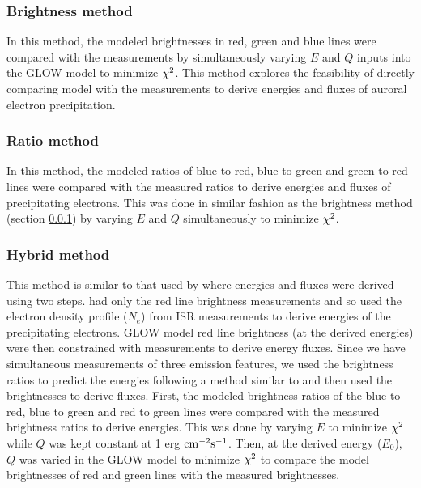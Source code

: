 \documentclass[crop=false,class=mitthesis,oneside,font=12pt]{standalone}
\begin{document}
\subsubsection{Brightness method}
\label{sec:brightness}
In this method, the modeled brightnesses in red, green and blue lines were compared with the measurements by simultaneously varying $E$ and $Q$ inputs into the GLOW model to minimize $\rm \chi^2$. This method explores the feasibility of directly comparing model with the measurements to derive energies and fluxes of auroral electron precipitation.

\subsubsection{Ratio method}
\label{sec:ratio}
In this method, the modeled ratios of blue to red, blue to green and green to red lines were compared with the measured ratios to derive energies and fluxes of precipitating electrons. This was done in similar fashion as the brightness method (section \ref{sec:brightness}) by varying $E$ and $Q$ simultaneously to minimize $\rm \chi^2$. 

\subsubsection{Hybrid method}
\label{sec:2step}

This method is similar to that used by \cite{pallamraju_2011} where energies and fluxes were derived using two steps.\cite{pallamraju_2011} had only the red line brightness measurements and so used the electron density profile ($N_e$) from ISR measurements to derive energies of the precipitating electrons. GLOW model red line brightness (at the derived energies) were then constrained with measurements to derive energy fluxes. Since we have simultaneous measurements of three emission features, we used the brightness ratios to predict the energies following a method similar to \cite{rees_1974} and then used the brightnesses to derive fluxes. First, the modeled brightness ratios of the blue to red, blue to green and red to green lines were compared with the measured brightness ratios to derive energies. This was done by varying $E$ to minimize $\rm \chi^2$ while $Q$ was kept constant at 1 erg $\rm cm^{-2} s^{-1}$. Then, at the derived energy ($E_0$), $Q$ was varied in the GLOW model to minimize $\rm \chi^2$ to compare the model brightnesses of red and green lines with the measured brightnesses. 
\end{document}
